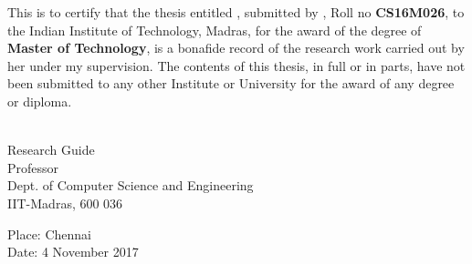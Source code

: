 \certificate
\vspace*{0.5in}
\noindent This is to certify that the thesis entitled {\bf {\thesistitle}}, 
submitted by {\bf {\thesisauthor}}, Roll no \textbf{CS16M026}, to the Indian Institute of Technology, 
Madras, for the award of the degree of {\bf Master of Technology}, 
is a bonafide record of the research work carried out by her under my
supervision. The contents of this thesis, in full or in parts, have not been
submitted to any other Institute or University for the award of any degree or diploma.
\vspace*{1.4in}
\hspace*{-0.25in}
\begin{singlespace}
 \\
\noindent Research Guide \\ 
\noindent Professor \\
\noindent Dept. of Computer Science and Engineering\\
\noindent IIT-Madras, 600 036 \\
\end{singlespace}
\vspace*{0.20in}
\noindent Place: Chennai\\ 
Date: 4 November 2017

